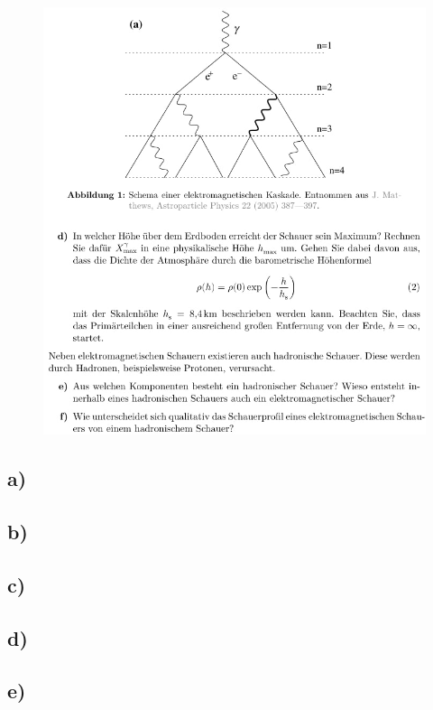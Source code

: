     \begin{figure}[H]
        \centering
        \includegraphics[width=\textwidth]{images/Aufgabe19b.jpg}
        \label{fig:2}
    \end{figure}

\subsection{a)}

\subsection{b)}

\subsection{c)}

\subsection{d)}

\subsection{e)}

